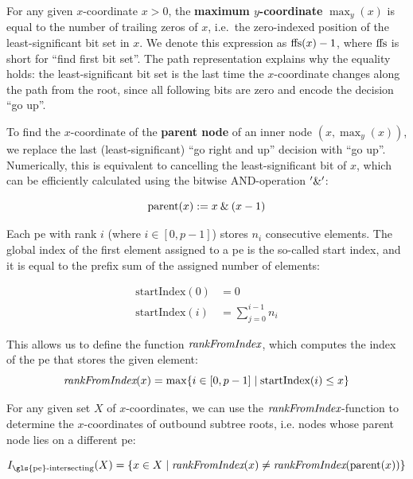For any given $x$-coordinate $x > 0$, the \textbf{maximum $y$-coordinate} $\max_y(x)$ is equal to the number of trailing zeros of $x$, i.e.\ the zero-indexed position of the least-significant bit set in $x$.
We denote this expression as $\textrm{ffs} (x) - 1$, where $\textrm{ffs}$ is short for \enquote{find first bit set}.
The path representation explains why the equality holds: the least-significant bit set is the last time the $x$-coordinate changes along the path from the root, since all following bits are zero and encode the decision \enquote{go up}.

To find the $x$-coordinate of the \textbf{parent node} of an inner node $(x, \max_y(x))$, we replace the last (least-significant) \enquote{go right and up} decision with \enquote{go up}. 
Numerically, this is equivalent to cancelling the least-significant bit of $x$, which can be efficiently calculated using the bitwise AND-operation $'\mathbin{\&}'$:

\begin{equation}
\label{eq:parent}
\textrm{parent} (x) := x \mathbin{\&} (x - 1)
\end{equation}

Each \gls{pe} with rank $i$ (where $i \in [0, p - 1]$) stores $n_i$ consecutive elements.
The global index of the first element assigned to a \gls{pe} is the so-called start index, and it is equal to the prefix sum of the assigned number of elements:

\begin{align}
\textrm{startIndex} (0) &= 0 \\
\textrm{startIndex} (i) &= \sum_{j = 0}^{i - 1} n_i
\label{eq:startIndex}
\end{align}

This allows us to define the function $\textit{rankFromIndex}$, which computes the index of the \gls{pe} that stores the given element:
\begin{equation}
\textit{rankFromIndex} (x) = \max \{i \in [0, p - 1] \;|\; \textrm{startIndex} (i) \leq x \}
\end{equation}

For any given set $X$ of $x$-coordinates, we can use the $\textit{rankFromIndex}$-function to determine the $x$-coordinates of outbound subtree roots, i.e. nodes whose parent node lies on a different \gls{pe}:

\newcommand{\rankIntersectingIndices}{I_{\textrm{\gls{pe}-intersecting}}}
\begin{equation}
\rankIntersectingIndices (X) = \{x \in X \;|\; \rankFromIndex (x) \neq \rankFromIndex (\textrm{parent} (x)) \}
\end{equation}

